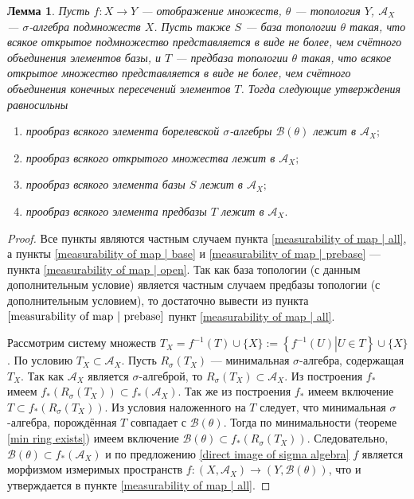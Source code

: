 \documentclass[12pt]{article}
\newtheorem{lemma}[theorem]{Лемма}
\numberwithin{theorem}{section}
\theoremstyle{definition}
\newcommand{\calA}{\mathcal{A}}
\newcommand{\calB}{\mathcal{B}}
\newcommand{\defineset}[2]{\left\{
	\left.
	#1
	\right\vert
	#2
	\right\}}
\begin{document}
	\begin{lemma} \label{measurability of map}
		Пусть $ f \colon X \to Y $ --- отображение множеств,
		$ \theta $ --- топология $ Y $, $ \calA_X $ --- $ \sigma $-алгебра подмножеств $ X $.
		Пусть также $ S $ --- база топологии $ \theta $ такая, 
		что всякое открытое подмножество представляется в виде не более, чем счётного объединения элементов базы, 
		и $ T $ --- предбаза топологии $ \theta $ такая, что всякое открытое множество представляется в виде не
		более, чем счётного объединения конечных пересечений элементов $ T $.
		Тогда следующие утверждения равносильны
		\begin{enumerate}
			\item прообраз всякого элемента борелевской $ \sigma $-алгебры $ \calB(\theta) $ лежит в $ \calA_X; $ \label{measurability of map | all}
			\item прообраз всякого открытого множества лежит в $ \calA_X; $ \label{measurability of map | open}
			\item прообраз всякого элемента базы $ S $ лежит в $ \calA_X; $ \label{measurability of map | base}
			\item прообраз всякого элемента предбазы $ T $ лежит в $ \calA_X. $ \label{measurability of map | prebase}
		\end{enumerate}
	\end{lemma}
	
	\begin{proof}
		Все пункты являются частным случаем пункта \ref{measurability of map | all},
		а пункты \ref{measurability of map | base} и \ref{measurability of map | prebase}
		--- пункта \ref{measurability of map | open}.
		Так как база топологии (с данным дополнительным условие) 
		является частным случаем предбазы топологии (с дополнительным условием),
		то достаточно вывести из пункта $ \ref{measurability of map | prebase} $
		пункт \ref{measurability of map | all}.
		
		Рассмотрим систему множеств $ T_X = f^{-1}(T) \cup \{X\} := \defineset{f^{-1}(U)}{U \in T} \cup \{X\} $.
		По условию $ T_X \subset \calA_X $. Пусть $ R_{\sigma}(T_X) $ --- минимальная $ \sigma $-алгебра, содержащая $ T_X $.
		Так как $ \calA_X $ является $ \sigma $-алгеброй, то $ R_{\sigma}(T_X) \subset \calA_X $.
		Из построения $ f_* $ имеем $ f_*(R_{\sigma}(T_X)) \subset f_*(\calA_X) $.
		Так же из построения $ f_* $ имеем включение $ T \subset f_*(R_{\sigma}(T_X)) $.
		Из условия наложенного на $ T $ следует, что минимальная $ \sigma $-алгебра, порождённая $ T $
		совпадает с $ \calB(\theta) $. Тогда по минимальности (теореме \ref{min ring exists})
		имеем включение $ \calB(\theta) \subset f_*(R_{\sigma}(T_X)) $.
		Следовательно, $ \calB(\theta) \subset f_{*}(\calA_X) $ и по предложению \ref{direct image of sigma algebra}
		$ f $ является морфизмом измеримых пространств $ f \colon (X, \calA_X) \to (Y, \calB(\theta)) $,
		что и утверждается в пункте \ref{measurability of map | all}.
	\end{proof}
	
\end{document}
